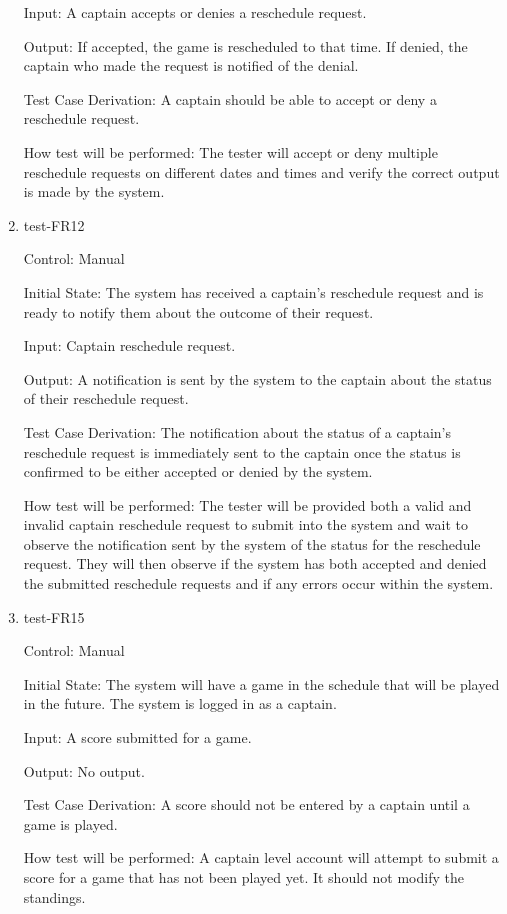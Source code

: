 \documentclass[12pt, titlepage]{article}
\begin{document}
\begin{enumerate}
Input: A captain accepts or denies a reschedule request.

Output: If accepted, the game is rescheduled to that time. If denied, the
captain who made the request is notified of the denial.

Test Case Derivation: A captain should be able to accept or deny a reschedule
request.

How test will be performed: The tester will accept or deny multiple reschedule
requests on different dates and times and verify the correct output is made by
the system.

\item{test-FR12\\}

Control: Manual
					
Initial State: The system has received a captain's reschedule request and is ready to
notify them about the outcome of their request.
					
Input: Captain reschedule request.
					
Output: A notification is sent by the system to the captain about the status of their
reschedule request.

Test Case Derivation: The notification about the status of a captain's reschedule
request is immediately sent to the captain once the status is confirmed to be either
accepted or denied by the system.
					
How test will be performed: The tester will be provided both a valid and invalid captain
reschedule request to submit into the system and wait to observe the notification sent
by the system of the status for the reschedule request. They will then observe if the
system has both accepted and denied the submitted reschedule requests and if any errors
occur within the system. 

\item{test-FR15\\}

Control: Manual

Initial State: The system will have a game in the schedule that will be played
in the future. The system is logged in as a captain.
          
Input: A score submitted for a game.

Output: No output.

Test Case Derivation: A score should not be entered by a captain until a game
is played.

How test will be performed: A captain level account will attempt to submit a
score for a game that has not been played yet. It should not modify the
standings.


\end{enumerate}
\end{document}
